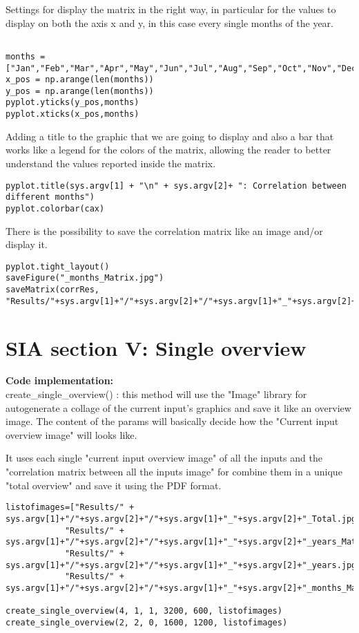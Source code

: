 Settings for display the matrix in the right way, in particular for the values to display on both the axis x and y, in this case every single months of the year.
\begin{lstlisting}

months = ["Jan","Feb","Mar","Apr","May","Jun","Jul","Aug","Sep","Oct","Nov","Dec"]
x_pos = np.arange(len(months))
y_pos = np.arange(len(months))
pyplot.yticks(y_pos,months)
pyplot.xticks(x_pos,months)
\end{lstlisting}
Adding a title to the graphic that we are going to display and also a bar that works like a legend for the colors of the matrix, allowing the reader to better understand the values reported inside the matrix.
\begin{lstlisting}
pyplot.title(sys.argv[1] + "\n" + sys.argv[2]+ ": Correlation between different months")
pyplot.colorbar(cax)
\end{lstlisting}

There is the possibility to save the correlation matrix like an image and/or display it.
\begin{lstlisting}
pyplot.tight_layout()
saveFigure("_months_Matrix.jpg")
saveMatrix(corrRes, "Results/"+sys.argv[1]+"/"+sys.argv[2]+"/"+sys.argv[1]+"_"+sys.argv[2]+"_months_CorrCoeff.csv")

\end{lstlisting}

\section{SIA section V: Single overview}
\label{SIA_section_V}
\textbf{Code implementation:}\\
create\_single\_overview() : this method will use the "Image" library for autogenerate a collage of the current input's graphics and save it like an overview image. The content of the params will basically decide how the "Current input overview image" will looks like.

It uses each single "current input overview image" of all the inputs and the "correlation matrix between all the inputs image" for combine them in a unique "total overview" and save it using the PDF format.

\begin{lstlisting}
listofimages=["Results/" + sys.argv[1]+"/"+sys.argv[2]+"/"+sys.argv[1]+"_"+sys.argv[2]+"_Total.jpg",
            "Results/" + sys.argv[1]+"/"+sys.argv[2]+"/"+sys.argv[1]+"_"+sys.argv[2]+"_years_Matrix.jpg", 
            "Results/" + sys.argv[1]+"/"+sys.argv[2]+"/"+sys.argv[1]+"_"+sys.argv[2]+"_years.jpg",
            "Results/" + sys.argv[1]+"/"+sys.argv[2]+"/"+sys.argv[1]+"_"+sys.argv[2]+"_months_Matrix.jpg"]

create_single_overview(4, 1, 1, 3200, 600, listofimages)
create_single_overview(2, 2, 0, 1600, 1200, listofimages)
\end{lstlisting}
